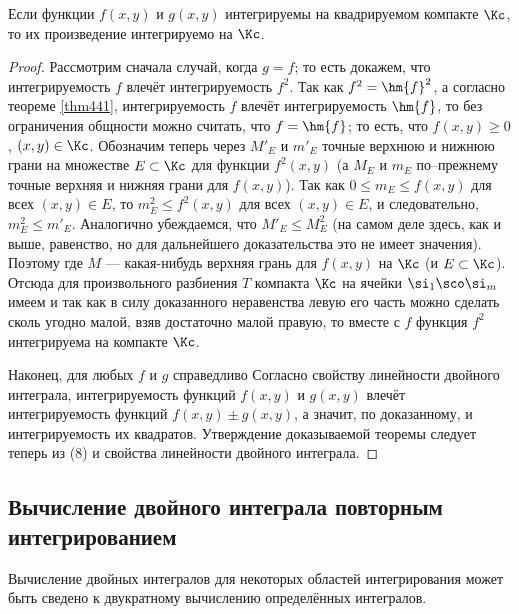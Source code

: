 \documentclass[a4paper]{article}
\begin{document}
\begin{theorem}
Если функции $f(x,y)$ и $g(x,y)$ интегрируемы на квадрируемом
компакте $\Kc$, то их произведение интегрируемо на $\Kc$.
\end{theorem}

\begin{proof}
Рассмотрим сначала случай, когда $g=f$; то есть докажем, что
интегрируемость $f$ влечёт интегрируемость $f^2$. Так как
$f^2=\hm{f}^2$, а согласно теореме \ref{thm441}, интегрируемость $f$
влечёт интегрируемость $\hm{f}$, то без ограничения общности можно
считать, что $f=\hm{f}$; то есть, что $f(x,y)\ge0$, $(x,y)\in\Kc$.
Обозначим теперь через $M'_E$ и $m'_E$ точные верхнюю и нижнюю грани
на множестве $E\subset\Kc$ для функции $f^2(x,y)$ (а $M_E$ и $m_E$
по--прежнему точные верхняя и нижняя грани для $f(x,y)$). Так как
$0\le m_E\le f(x,y)$ для всех $(x,y)\in E$, то $m^2_E\le f^2(x,y)$
для всех $(x,y)\in E$, и следовательно, $m^2_E\le m'_E$. Аналогично
убеждаемся, что $M'_E\le M_E^2$ (на самом деле здесь, как и выше,
равенство, но для дальнейшего доказательства это не имеет значения).
Поэтому  где $M$ --- какая-нибудь верхняя грань для $f(x,y)$ на
$\Kc$ (и $E\subset\Kc$). Отсюда для произвольного разбиения $T$
компакта $\Kc$ на ячейки $\si_1\sco\si_m$ имеем  и так как в силу доказанного
неравенства левую его часть можно сделать сколь угодно малой, взяв
достаточно малой правую, то вместе с $f$ функция $f^2$ интегрируема
на компакте $\Kc$.

Наконец, для любых $f$ и $g$ справедливо  Согласно свойству линейности двойного интеграла,
интегрируемость функций $f(x,y)$ и $g(x,y)$ влечёт интегрируемость
функций $f(x,y)\pm g(x,y)$, а значит, по доказанному, и
интегрируемость их квадратов. Утверждение доказываемой теоремы
следует теперь из (8) и свойства линейности двойного интеграла.
\end{proof}

\subsection{Вычисление двойного интеграла повторным интегрированием}

Вычисление двойных интегралов для некоторых областей интегрирования
может быть сведено к двукратному вычислению определённых интегралов.
\end{document}
